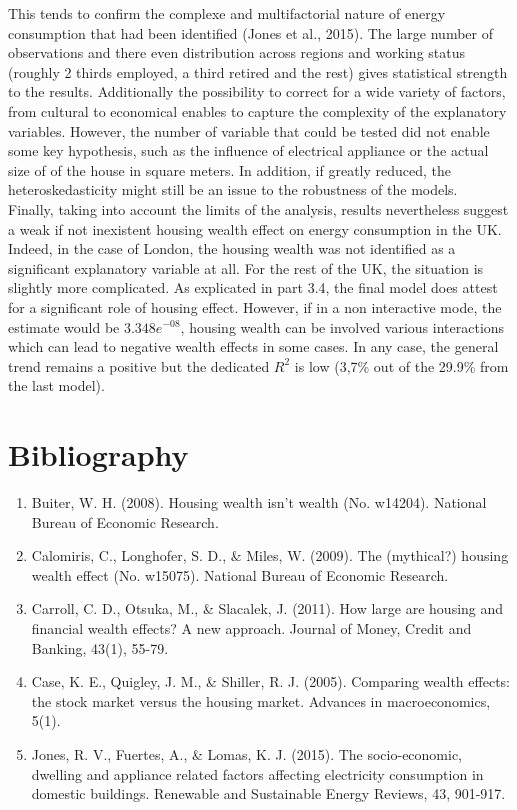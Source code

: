 \documentclass[12pt]{article}
\begin{document}
This tends to confirm the complexe and multifactorial nature of energy consumption that had been identified (Jones et al., 2015). The large number of observations and there even distribution across regions and working status (roughly 2 thirds employed, a third retired and the rest) gives statistical strength to the results. Additionally the possibility to correct for a wide variety of factors, from cultural to economical enables to capture the complexity of the explanatory variables. However, the number of variable that could be tested did not enable some key hypothesis, such as the influence of electrical appliance or the actual size of of the house in square meters. In addition, if greatly reduced, the heteroskedasticity might still be an issue to the robustness of the models.\\

Finally, taking into account the limits of the analysis, results nevertheless suggest a weak if not inexistent housing wealth effect on energy consumption in the UK. Indeed, in the case of London, the housing wealth was not identified as a significant explanatory variable at all. For the rest of the UK, the situation is slightly more complicated. As explicated in part 3.4, the final model does attest for a significant role of housing effect. However, if in a non interactive mode, the estimate would be $3.348e^{-08}$, housing wealth can be involved various interactions which can lead to negative wealth effects in some cases. In any case, the general trend remains a positive but the dedicated $R^2$ is low (3,7\% out of the 29.9\% from the last model).

\section{Bibliography}
\begin{enumerate}

\item Buiter, W. H. (2008). Housing wealth isn't wealth (No. w14204). National Bureau of Economic Research.

\item Calomiris, C., Longhofer, S. D., \& Miles, W. (2009). The (mythical?) housing wealth effect (No. w15075). National Bureau of Economic Research.

\item Carroll, C. D., Otsuka, M., \& Slacalek, J. (2011). How large are housing and financial wealth effects? A new approach. Journal of Money, Credit and Banking, 43(1), 55-79.

\item Case, K. E., Quigley, J. M., \& Shiller, R. J. (2005). Comparing wealth effects: the stock market versus the housing market. Advances in macroeconomics, 5(1).

\item Jones, R. V., Fuertes, A., \& Lomas, K. J. (2015). The socio-economic, dwelling and appliance related factors affecting electricity consumption in domestic buildings. Renewable and Sustainable Energy Reviews, 43, 901-917.

\end{enumerate}
\end{document}
